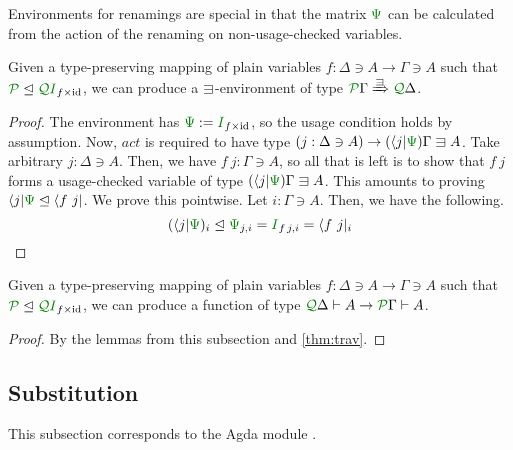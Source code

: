 \documentclass[submission,copyright,creativecommons]{eptcs}
\begin{document}
Environments for renamings are special in that the matrix $\rescomment\Psi$ can
be calculated from the action of the renaming on non-usage-checked variables.

\begin{lemma}\label{lem:ren-env}
  Given a type-preserving mapping of plain variables
  $f : \Delta \ni A \to \Gamma \ni A$ such that
  $\resctx P \subres \resctx Q\rescomment I_{f\times\id}$,
  we can produce a $\lvar$-environment of type
  $\ctx{\Gamma}{P} \subst{\lvar} \ctx{\Delta}{Q}$.
\end{lemma}
\begin{proof}
  The environment has $\rescomment\Psi := \rescomment I_{f\times\id}$,
  so the usage condition holds by assumption.
  Now, $\mathit{act}$ is required to have type
  $(j : \Delta \ni A) \to (\langle j \rvert\rescomment\Psi)\Gamma \lvar A$.
  Take arbitrary $j : \Delta \ni A$.
  Then, we have $f~j : \Gamma \ni A$, so all that is left is to show that $f~j$
  forms a usage-checked variable of type
  $(\langle j \rvert\rescomment\Psi)\Gamma \lvar A$.
  This amounts to proving
  $\langle j \rvert\rescomment\Psi \subres \langle f~j \rvert$.
  We prove this pointwise.
  Let $i : \Gamma \ni A$.
  Then, we have the following.
  \[
    (\langle j \rvert\rescomment\Psi)_i
    \subres \rescomment\Psi_{j,i}
    = \rescomment I_{f\,j,i}
    = \langle f~j \rvert_i
  \]
\end{proof}

\begin{corollary}\label{cor:ren}
  Given a type-preserving mapping of plain variables
  $f : \Delta \ni A \to \Gamma \ni A$ such that
  $\resctx P \subres \resctx Q\rescomment I_{f\times\id}$,
  we can produce a function of type
  $\ctx{\Delta}{Q} \vdash A \to \ctx{\Gamma}{P} \vdash A$.
\end{corollary}
\begin{proof}
  By the lemmas from this subsection and \autoref{thm:trav}.
\end{proof}

\subsection{Substitution}

This subsection corresponds to the Agda module
.
\end{document}
